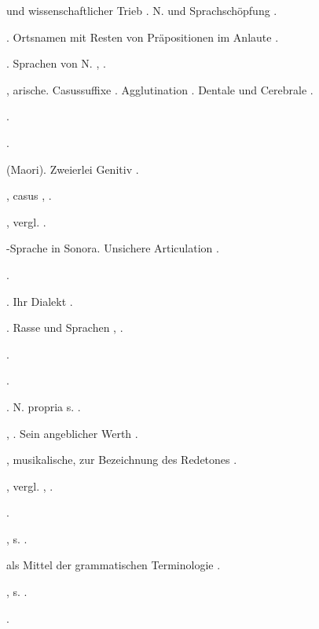 \begin{register}
 und wissenschaftlicher Trieb \pageref{sp.17}. N. und Sprachschöpfung \pageref{sp.309}.

. Ortsnamen mit Resten von Präpositionen im Anlaute \pageref{sp.203}.

 \pageref{sp.147}. Sprachen von N. \pageref{sp.280}, \pageref{sp.282}.

, arische. Casussuffixe \pageref{sp.159}. Agglutination \pageref{sp.257}. Dentale und Cerebrale \pageref{sp.269}.

 \pageref{sp.165}.


 \pageref{sp.165}.

 (Maori). Zweierlei Genitiv \pageref{sp.463}.

, casus \pageref{sp.102}, \pageref{sp.151}.

, vergl. .

-Sprache in Sonora. Unsichere Articulation \pageref{sp.194}.

 \pageref{sp.157}.

. Ihr Dialekt \pageref{sp.190}.

. Rasse und Sprachen \pageref{sp.147}, \pageref{sp.177}.

 \pageref{sp.103}.

 \pageref{sp.115}.

. N. propria s. .

 \pageref{sp.102}, \sed{\pageref{sp.115},} \pageref{sp.354}. Sein angeblicher Werth \pageref{sp.392}.

, musikalische, zur Bezeichnung des Redetones \pageref{sp.377}.

, vergl. ,  \pageref{sp.103}.

 \pageref{sp.282}\sed{, \pageref{sp.426}}.

, s. .

 als Mittel der grammatischen Terminologie \pageref{sp.116}.

, s. .


 \pageref{sp.150}.


\end{register}
